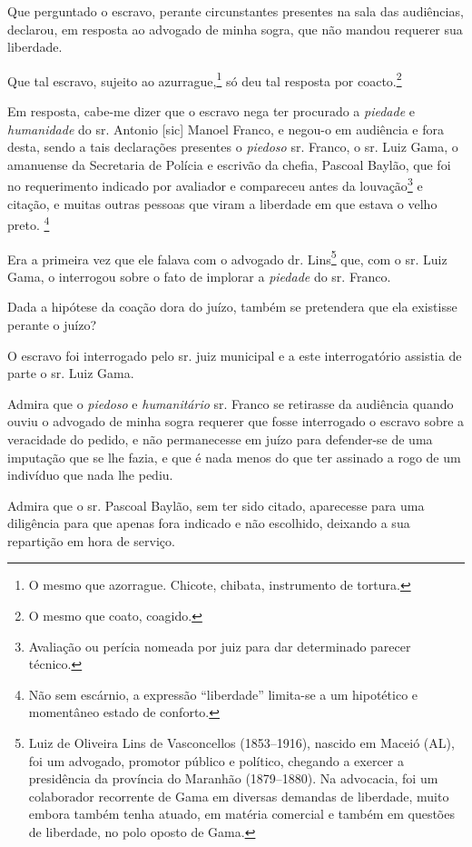 {Que perguntado o escravo, perante circunstantes presentes na sala das
audiências, declarou, em resposta ao advogado de minha sogra, que não
mandou requerer sua liberdade.

Que tal escravo, sujeito ao azurrague,\footnote{ O mesmo que azorrague.
  Chicote, chibata, instrumento de tortura.} só deu tal resposta por
coacto.\footnote{ O mesmo que coato, coagido.}

Em resposta, cabe-me dizer que o escravo nega ter procurado a
\emph{piedade} e \emph{humanidade} do sr. Antonio {[}sic{]} Manoel
Franco, e negou-o em audiência e fora desta, sendo a tais declarações
presentes o \emph{piedoso} sr. Franco, o sr. Luiz Gama, o amanuense da
Secretaria de Polícia e escrivão da chefia, Pascoal Baylão, que foi no
requerimento indicado por avaliador e compareceu antes da
louvação\footnote{ Avaliação ou perícia nomeada por juiz para dar
  determinado parecer técnico.} e citação, e muitas outras pessoas que
viram a liberdade em que estava o velho preto. \footnote{ Não sem
  escárnio, a expressão ``liberdade'' limita-se a um hipotético e
  momentâneo estado de conforto.}

Era a primeira vez que ele falava com o advogado dr. Lins\footnote{
  Luiz de Oliveira Lins de Vasconcellos (1853--1916), nascido em Maceió
  (AL), foi um advogado, promotor público e político, chegando a exercer
  a presidência da província do Maranhão (1879--1880). Na advocacia, foi
  um colaborador recorrente de Gama em diversas demandas de liberdade,
  muito embora também tenha atuado, em matéria comercial e também em
  questões de liberdade, no polo oposto de Gama.} que, com o sr. Luiz
Gama, o interrogou sobre o fato de implorar a \emph{piedade} do sr.
Franco.

Dada a hipótese da coação dora do juízo, também se pretendera que ela
existisse perante o juízo?

O escravo foi interrogado pelo sr. juiz municipal e a este
interrogatório assistia de parte o sr. Luiz Gama.

Admira que o \emph{piedoso} e \emph{humanitário} sr. Franco se retirasse
da audiência quando ouviu o advogado de minha sogra requerer que fosse
interrogado o escravo sobre a veracidade do pedido, e não permanecesse
em juízo para defender-se de uma imputação que se lhe fazia, e que é
nada menos do que ter assinado a rogo de um indivíduo que nada lhe
pediu.

Admira que o sr. Pascoal Baylão, sem ter sido citado, aparecesse para
uma diligência para que apenas fora indicado e não escolhido, deixando a
sua repartição em hora de serviço.

}
